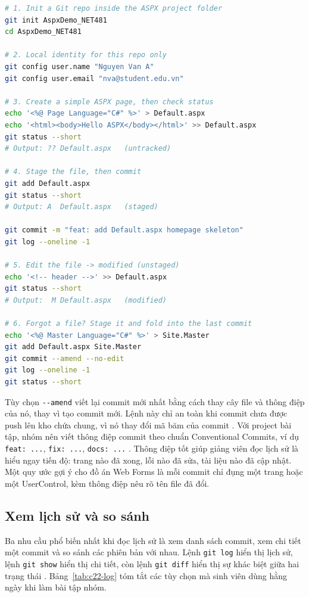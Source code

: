 \begin{lstlisting}[language=bash]
# 1. Init a Git repo inside the ASPX project folder
git init AspxDemo_NET481
cd AspxDemo_NET481

# 2. Local identity for this repo only
git config user.name "Nguyen Van A"
git config user.email "nva@student.edu.vn"

# 3. Create a simple ASPX page, then check status
echo '<%@ Page Language="C#" %>' > Default.aspx
echo '<html><body>Hello ASPX</body></html>' >> Default.aspx
git status --short
# Output: ?? Default.aspx   (untracked)

# 4. Stage the file, then commit
git add Default.aspx
git status --short
# Output: A  Default.aspx   (staged)

git commit -m "feat: add Default.aspx homepage skeleton"
git log --oneline -1

# 5. Edit the file -> modified (unstaged)
echo '<!-- header -->' >> Default.aspx
git status --short
# Output:  M Default.aspx   (modified)

# 6. Forgot a file? Stage it and fold into the last commit
echo '<%@ Master Language="C#" %>' > Site.Master
git add Default.aspx Site.Master
git commit --amend --no-edit
git log --oneline -1
git status --short
\end{lstlisting}

Tùy chọn \verb|--amend| viết lại commit mới nhất bằng cách thay cây file và thông điệp của nó, thay vì tạo commit mới.
Lệnh này chỉ an toàn khi commit chưa được push lên kho chứa chung, vì nó thay đổi mã băm của commit \cite{progit}.
Với project bài tập, nhóm nên viết thông điệp commit theo chuẩn Conventional Commits, ví dụ \verb|feat: ...|, \verb|fix: ...|, \verb|docs: ...| \cite{convcommits}.
Thông điệp tốt giúp giảng viên đọc lịch sử là hiểu ngay tiến độ: trang nào đã xong, lỗi nào đã sửa, tài liệu nào đã cập nhật.
Một quy ước gợi ý cho đồ án Web Forms là mỗi commit chỉ đụng một trang hoặc một UserControl, kèm thông điệp nêu rõ tên file đã đổi.

\subsection{Xem lịch sử và so sánh}
\label{subsec:c22-history}

Ba nhu cầu phổ biến nhất khi đọc lịch sử là xem danh sách commit, xem chi tiết một commit và so sánh các phiên bản với nhau.
Lệnh \verb|git log| hiển thị lịch sử, lệnh \verb|git show| hiển thị chi tiết, còn lệnh \verb|git diff| hiển thị sự khác biệt giữa hai trạng thái \cite{progit}.
Bảng~\ref{tab:c22-log} tóm tắt các tùy chọn mà sinh viên dùng hằng ngày khi làm bài tập nhóm.

